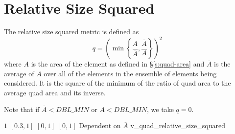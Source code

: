 \section{Relative Size Squared\label{s:quad-rel-size-squared}}

The relative size squared metric is defined as
\[
q = \left( \min\left\{ \frac{A}{\overline{A}}, \frac{\overline{A}}{A} \right\} \right)^2
\]
where $A$ is the area of the element as defined in \S\ref{s:quad-area}
and $\overline{A}$ is the average of $A$ over all of the elements in the
ensemble of elements being considered.
It is the square of the minimum of the ratio of quad area to the average quad area and its inverse.

Note that if $\overline{A} < DBL\_MIN$ or $A < DBL\_MIN$, we take $q = 0$.

%
{$1$}%
{$[0.3, 1]$}%
{$[0,1]$}%
{$[0,1]$}%
{Dependent on $\overline{A}$}%
{\cite{knu:03}}%
{v\_quad\_relative\_size\_squared}%

